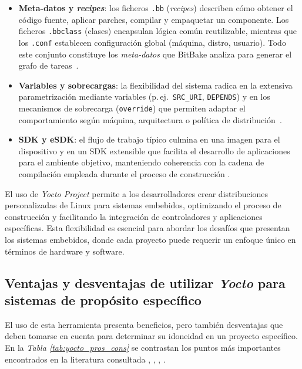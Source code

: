 \begin{itemize}
    \item \textbf{Meta-datos y \emph{recipes}}: los ficheros \verb|.bb| (\emph{recipes}) describen cómo obtener el código fuente, aplicar parches, compilar y empaquetar un componente.  Los ficheros \verb|.bbclass| (clases) encapsulan lógica común reutilizable, mientras que los \verb|.conf| establecen configuración global (máquina, distro, usuario).  Todo este conjunto constituye los \textit{meta-datos} que BitBake analiza para generar el grafo de tareas \cite{bitbake_manual_2025}.
    
    \item \textbf{Variables y sobrecargas}: la flexibilidad del sistema radica en la extensiva parametrización mediante variables (p.\,ej.\ \texttt{SRC\_URI}, \texttt{DEPENDS}) y en los mecanismos de sobrecarga (\texttt{override}) que permiten adaptar el comportamiento según máquina, arquitectura o política de distribución \cite{bitbake_manual_2025}.  
    \item \textbf{SDK y eSDK}: el flujo de trabajo típico culmina en una imagen para el dispositivo y en un SDK extensible que facilita el desarrollo de aplicaciones para el ambiente objetivo, manteniendo coherencia con la cadena de compilación empleada durante el proceso de construcción \cite{yocto_overview_2025}.  
  \end{itemize}

El uso de \textit{Yocto Project} permite a los desarrolladores crear distribuciones personalizadas de Linux para sistemas embebidos, optimizando el proceso de construcción y facilitando la integración de controladores y aplicaciones específicas. Esta flexibilidad es esencial para abordar los desafíos que presentan los sistemas embebidos, donde cada proyecto puede requerir un enfoque único en términos de hardware y software.

\subsection{Ventajas y desventajas de utilizar \textit{Yocto} para sistemas de propósito específico}
El uso de esta herramienta presenta beneficios, pero también desventajas que deben tomarse en cuenta para determinar su idoneidad en un proyecto específico. En la \textit{Tabla \ref{tab:yocto_pros_cons}} se contrastan los puntos más importantes encontrados en la literatura consultada \cite{streif_2016}, \cite{abbott_2018}, \cite{pera_2022}, \cite{karacali_2024}.


